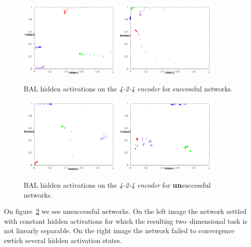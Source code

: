 \begin{figure}[H]
  \centering
  \includegraphics[width=0.45\textwidth]{../presentation/img/nice.png}  %
  \includegraphics[width=0.45\textwidth]{../presentation/img/left_top.png}   %
  \caption{BAL hidden activations on the \emph{4-2-4 encoder} for successful networks.}
  \label{fig:results-hidden-activations-bal-good}
\end{figure}

\begin{figure}[H]
  \centering
  \includegraphics[width=0.45\textwidth]{../presentation/img/tazisko.png}   %
  \includegraphics[width=0.45\textwidth]{../presentation/img/non-convergent.png}   %
  \caption{BAL hidden activations on the \emph{4-2-4 encoder} for {\bf un}successful networks.}
  \label{fig:results-hidden-activations-bal-bad}
\end{figure}

On figure~\ref{fig:results-hidden-activations-bal-bad} we see unsuccessful networks. On the left image the network settled with constant hidden activations for which the resulting two--dimensional task is not linearly separable. On the right image the network failed to convergence swtich several hidden activation states.
